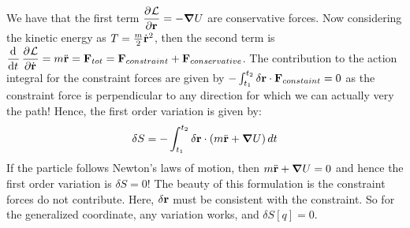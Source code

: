 \documentclass[../PHYS306Notes.tex]{subfiles}
\begin{document}
We have that the first term $\dpd{\LL}{\v{r}} = -\grad{U}$ are conservative forces. Now considering the kinetic energy as $T = \frac{m}{2}\dot{\mathbf{r}}^2$, then the second term is $\dod{}{t}\dpd{\LL}{\dot{\v{r}}} = m\ddot{\v{r}} = \v{F}_{tot} = \v{F}_{constraint} + \v{F}_{conservative}$. The contribution to the action integral for the constraint forces are given by $-\int_{t_1}^{t_2}\delta\mathbf{r}\cdot\mathbf{F}_{constaint} = 0$ as the constraint force is perpendicular to any direction for which we can actually very the path! Hence, the first order variation is given by:
\[\delta S = -\int_{t_1}^{t_2}\delta\mathbf{r}\cdot\left(m\ddot{\mathbf{r}} + \grad{U}\right)dt\]
If the particle follows Newton's laws of motion, then $m\ddot{\mathbf{r}} + \grad{U} = 0$ and hence the first order variation is $\delta S = 0$! The beauty of this formulation is the constraint forces do not contribute. Here, $\delta\mathbf{r}$ must be consistent with the constraint. So for the generalized coordinate, any variation works, and $\delta S[q] = 0$.
\end{document}
